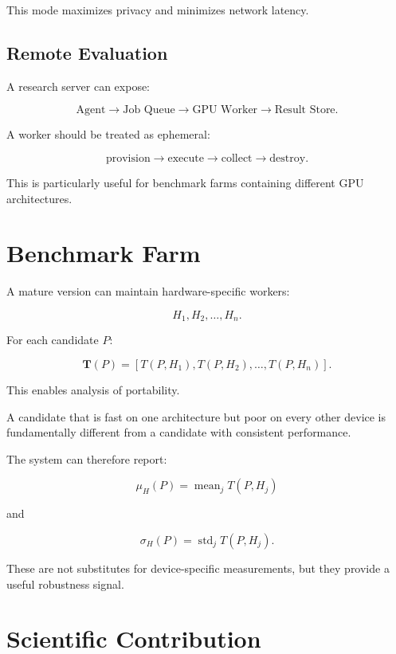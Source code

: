 \documentclass[11pt,a4paper,oneside]{report}
\begin{document}
This mode maximizes privacy and minimizes network latency.

\section{Remote Evaluation}

A research server can expose:

\[
\text{Agent}
\rightarrow
\text{Job Queue}
\rightarrow
\text{GPU Worker}
\rightarrow
\text{Result Store}.
\]

A worker should be treated as ephemeral:

\[
\text{provision}
\rightarrow
\text{execute}
\rightarrow
\text{collect}
\rightarrow
\text{destroy}.
\]

This is particularly useful for benchmark farms containing different GPU architectures.

\chapter{Benchmark Farm}

A mature version can maintain hardware-specific workers:

\[
H_1,H_2,\ldots,H_n.
\]

For each candidate $P$:

\[
\mathbf{T}(P)=
[T(P,H_1),T(P,H_2),\ldots,T(P,H_n)].
\]

This enables analysis of portability.

A candidate that is fast on one architecture but poor on every other device is fundamentally
different from a candidate with consistent performance.

The system can therefore report:

\begin{equation}
\mu_H(P)=\operatorname{mean}_j T(P,H_j)
\end{equation}

and

\begin{equation}
\sigma_H(P)=\operatorname{std}_j T(P,H_j).
\end{equation}

These are not substitutes for device-specific measurements, but they provide a useful robustness
signal.

\chapter{Scientific Contribution}
\end{document}
